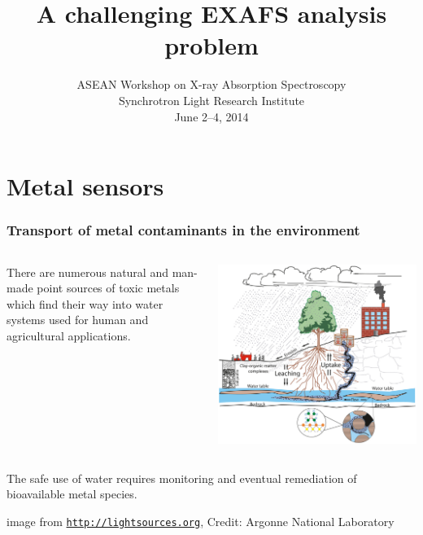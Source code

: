 \documentclass[10pt, xcolor=x11names, compress]{beamer}
\title{A challenging EXAFS analysis problem}
\date[ACXAS 2014]{ASEAN Workshop on X-ray Absorption Spectroscopy\\
  Synchrotron Light Research Institute\\June 2--4, 2014}
\begin{document}
\maketitle


\section{Metal sensors}

\begin{frame}
  \frametitle{Transport of metal contaminants in the environment}

  \begin{columns}
    \begin{column}{0.5\linewidth}
      There are numerous natural and man-made point sources of toxic
      metals which find their way into water systems used for human
      and agricultural applications.
    \end{column}
    \begin{column}{0.5\linewidth}
      \includegraphics[width=\linewidth]{images/APS016h_sm.jpg}      
    \end{column}
  \end{columns}

  \bigskip

  \begin{exampleblock}{}
    \begin{center}
      The safe use of water requires \alert{monitoring} and eventual
      remediation of bioavailable metal species.
    \end{center}
  \end{exampleblock}

  \begin{bottomnote}[0.7][19.5]
    image from \href{http://lightsources.org}
    {\color{LightBlue4}{\ComputerMouse~}\texttt{http://lightsources.org}},
    Credit: Argonne National Laboratory
  \end{bottomnote}
\end{frame}
\end{document}
